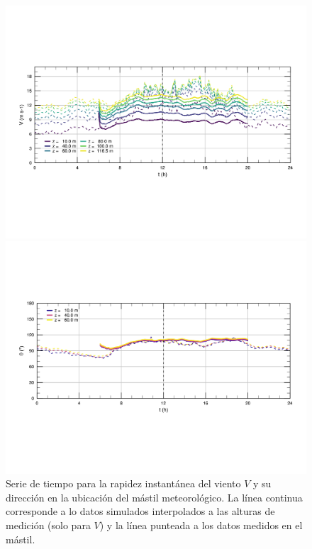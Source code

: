 \begin{figure}[H]
	\centering
	\includegraphics[width=1\linewidth,trim={9mm 63mm 10mm 55mm},clip]{Imagenes/06/hov/ts_v}%
	
	\includegraphics[width=1\linewidth,trim={12mm 55mm 10mm 55mm},clip]{Imagenes/06/hov/ts_o}%
	\caption{Serie de tiempo para la rapidez instantánea del viento $V$ y su dirección en la ubicación del mástil meteorológico. La línea continua corresponde a lo datos simulados interpolados a las alturas de medición (solo para $V$) y la línea punteada a los datos medidos en el mástil.}
	\label{fig:06_hov_ts}
\end{figure}

